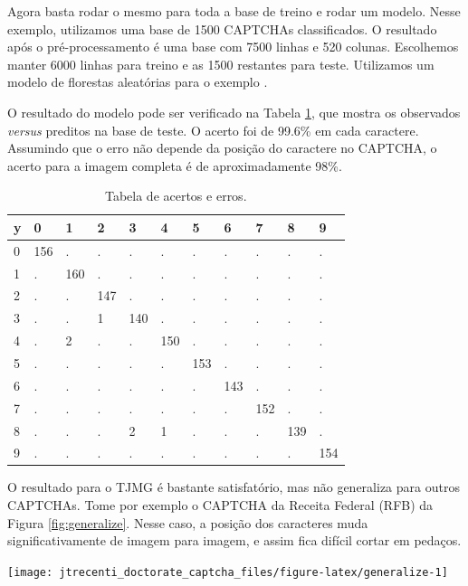 \documentclass[12pt,]{report}
\let\origfigure\figure
\let\endorigfigure\endfigure
\renewenvironment{figure}[1][2] {
    \expandafter\origfigure\expandafter[H]
} {
    \endorigfigure
}
\begin{document}
Agora basta rodar o mesmo para toda a base de treino e rodar um modelo.
Nesse exemplo, utilizamos uma base de 1500 CAPTCHAs classificados. O
resultado após o pré-processamento é uma base com 7500 linhas e 520
colunas. Escolhemos manter 6000 linhas para treino e as 1500 restantes
para teste. Utilizamos um modelo de florestas aleatórias para o exemplo
\citep{breiman2001random}.

O resultado do modelo pode ser verificado na Tabela \ref{tab:errosTJMG},
que mostra os observados \emph{versus} preditos na base de teste. O
acerto foi de 99.6\% em cada caractere. Assumindo que o erro não depende
da posição do caractere no CAPTCHA, o acerto para a imagem completa é de
aproximadamente 98\%.

\begin{table}

\caption{\label{tab:errosTJMG}Tabela de acertos e erros.}
\centering
\begin{tabular}[t]{l|l|l|l|l|l|l|l|l|l|l}
\hline
y & 0 & 1 & 2 & 3 & 4 & 5 & 6 & 7 & 8 & 9\\
\hline
0 & 156 & . & . & . & . & . & . & . & . & .\\
\hline
1 & . & 160 & . & . & . & . & . & . & . & .\\
\hline
2 & . & . & 147 & . & . & . & . & . & . & .\\
\hline
3 & . & . & 1 & 140 & . & . & . & . & . & .\\
\hline
4 & . & 2 & . & . & 150 & . & . & . & . & .\\
\hline
5 & . & . & . & . & . & 153 & . & . & . & .\\
\hline
6 & . & . & . & . & . & . & 143 & . & . & .\\
\hline
7 & . & . & . & . & . & . & . & 152 & . & .\\
\hline
8 & . & . & . & 2 & 1 & . & . & . & 139 & .\\
\hline
9 & . & . & . & . & . & . & . & . & . & 154\\
\hline
\end{tabular}
\end{table}

O resultado para o TJMG é bastante satisfatório, mas não generaliza para
outros CAPTCHAs. Tome por exemplo o CAPTCHA da Receita Federal (RFB) da
Figura \ref{fig:generalize}. Nesse caso, a posição dos caracteres muda
significativamente de imagem para imagem, e assim fica difícil cortar em
pedaços.

\begin{figure}

{\centering \texttt{[image: jtrecenti\_doctorate\_captcha\_files/figure-latex/generalize-1]} 

}

\caption{CAPTCHA Receita Federal}\label{fig:generalize}
\end{figure}
\end{document}
